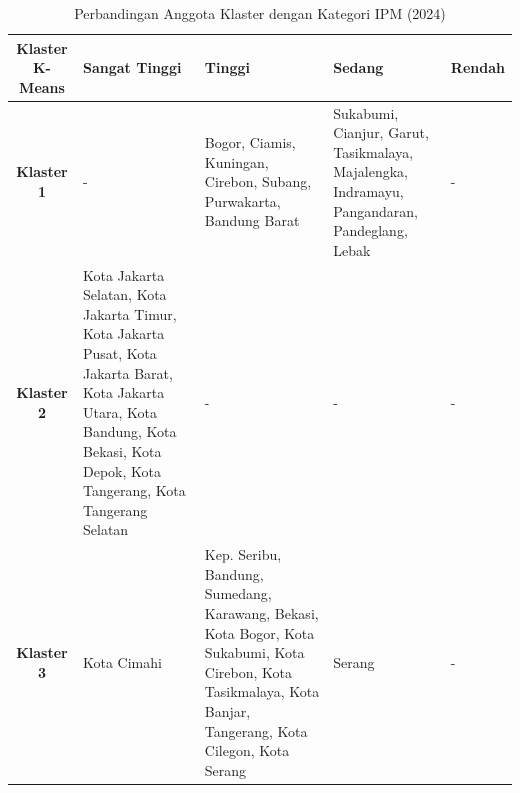 \begin{table}[H]
\centering
\caption{Perbandingan Anggota Klaster dengan Kategori IPM (2024)} \label{tab:ipm_cross_2024}
\begin{tabular}{|c|p{2cm}|p{2cm}|p{2cm}|p{2cm}|}
\hline
\textbf{Klaster K-Means} & \textbf{Sangat Tinggi} & \textbf{Tinggi} & \textbf{Sedang} & \textbf{Rendah} \\ \hline
\textbf{Klaster 1} & - & Bogor, Ciamis, Kuningan, Cirebon, Subang, Purwakarta, Bandung Barat & Sukabumi, Cianjur, Garut, Tasikmalaya, Majalengka, Indramayu, Pangandaran, Pandeglang, Lebak & - \\ \hline
\textbf{Klaster 2} & Kota Jakarta Selatan, Kota Jakarta Timur, Kota Jakarta Pusat, Kota Jakarta Barat, Kota Jakarta Utara, Kota Bandung, Kota Bekasi, Kota Depok, Kota Tangerang, Kota Tangerang Selatan & - & - & - \\ \hline
\textbf{Klaster 3} & Kota Cimahi & Kep. Seribu, Bandung, Sumedang, Karawang, Bekasi, Kota Bogor, Kota Sukabumi, Kota Cirebon, Kota Tasikmalaya, Kota Banjar, Tangerang, Kota Cilegon, Kota Serang & Serang & - \\ \hline
\end{tabular}
\end{table}